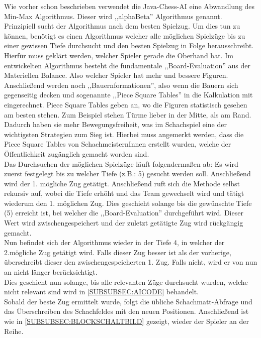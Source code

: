 \documentclass[12pt,a4paper]{article}
\begin{document}
{Wie vorher schon beschrieben verwendet die Java-Chess-AI eine Abwandlung des Min-Max Algorithmus. Dieser wird ,,alphaBeta'' Algorithmus genannt. \\
Prinzipiell sucht der Algorithmus nach dem besten Spielzug. Um dies tun zu können, benötigt es einen Algorithmus welcher alle möglichen Spielzüge bis zu einer gewissen Tiefe durchsucht und den besten Spielzug in Folge herausschreibt. \\ 
Hierfür muss geklärt werden, welcher Spieler gerade die Oberhand hat. Im entwickelten Algorithmus besteht die fundamentale ,,Board-Evaluation'' aus der Materiellen Balance. Also welcher Spieler hat mehr und bessere Figuren. Anschließend werden noch  ,,Bauernformationen'', also wenn die Bauern sich gegenseitig decken und sogenannte ,,Piece Square Tables'' in die Kalkulation mit eingerechnet. Piece Square Tables geben an, wo die Figuren statistisch gesehen am besten stehen. Zum Beispiel stehen Türme lieber in der Mitte, als am Rand. Dadurch haben sie mehr Bewegungsfreiheit, was im Schachspiel eine der wichtigsten Strategien zum Sieg ist. Hierbei muss angemerkt werden, dass die Piece Square Tables von SchachmeisternInnen erstellt wurden, welche der Öffentlichkeit zugänglich gemacht worden sind. \\[2ex]
Das Durchsuchen der möglichen Spielzüge läuft folgendermaßen ab: Es wird zuerst festgelegt bis zu welcher Tiefe (z.B.: 5) gesucht werden soll. Anschließend wird der 1. mögliche Zug getätigt. Anschließend ruft sich die Methode selbst rekursiv auf, wobei die Tiefe erhöht und das Team gewechselt wird und tätigt wiederum den 1. möglichen Zug. Dies geschieht solange bis die gewünschte Tiefe (5) erreicht ist, bei welcher die ,,Board-Evaluation'' durchgeführt wird. Dieser Wert wird zwischengespeichert und der zuletzt getätigte Zug wird rückgängig gemacht. \\
Nun befindet sich der Algorithmus wieder in der Tiefe 4, in welcher der 2.mögliche Zug getätigt wird. Falls dieser Zug besser ist als der vorherige, überschreibt dieser den zwischengespeicherten 1. Zug. Falls nicht, wird er von nun an nicht länger berücksichtigt. \\
Dies geschieht nun solange, bis alle relevanten Züge durchsucht wurden, welche nicht relevant sind wird in \ref{SUBSUBSEC:AICODE} behandelt. \\
Sobald der beste Zug ermittelt wurde, folgt die übliche Schachmatt-Abfrage und das Überschreiben des Schachfeldes mit den neuen Positionen. Anschließend ist wie in \ref{SUBSUBSEC:BLOCKSCHALTBILD} gezeigt, wieder der Spieler an der Reihe. \\[2ex]
}
\end{document}
